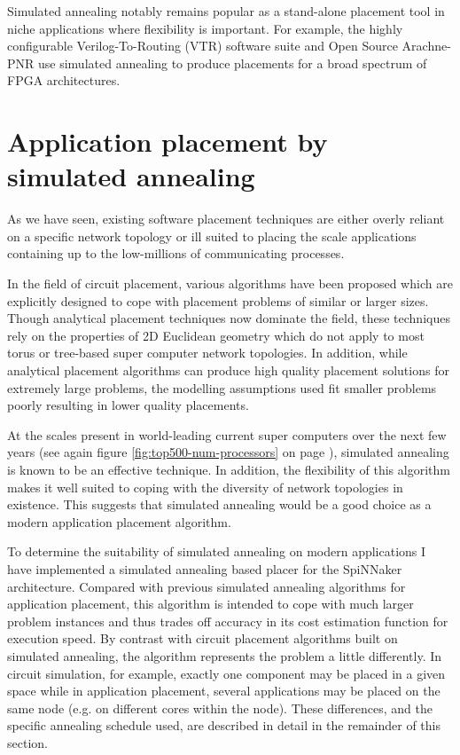 				Simulated annealing notably remains popular as a stand-alone placement
				tool in niche applications where flexibility is important. For example,
				the highly configurable Verilog-To-Routing (VTR) software suite
				\cite{luu14} and Open Source Arachne-PNR \cite{cseed} use simulated
				annealing to produce placements for a broad spectrum of FPGA
				architectures.
	
	\section{Application placement by simulated annealing}
		
		\label{sec:placement-by-annealing}	
		
		As we have seen, existing software placement techniques are either overly
		reliant on a specific network topology or ill suited to placing the scale
		applications containing up to the low-millions of communicating processes.
		
		In the field of circuit placement, various algorithms have been proposed
		which are explicitly designed to cope with placement problems of similar or
		larger sizes. Though analytical placement techniques now dominate the
		field, these techniques rely on the properties of 2D Euclidean geometry
		which do not apply to most torus or tree-based super computer network
		topologies. In addition, while analytical placement algorithms can produce
		high quality placement solutions for extremely large problems, the
		modelling assumptions used fit smaller problems poorly resulting in lower
		quality placements.
		
		At the scales present in world-leading current super computers over the
		next few years (see again figure \ref{fig:top500-num-processors} on page
		\pageref{fig:top500-num-processors}), simulated annealing is known to be an
		effective technique. In addition, the flexibility of this algorithm makes
		it well suited to coping with the diversity of network topologies in
		existence. This suggests that simulated annealing would be a good choice as
		a modern application placement algorithm.
		
		To determine the suitability of simulated annealing on modern applications
		I have implemented a simulated annealing based placer for the SpiNNaker
		architecture. Compared with previous simulated annealing algorithms for
		application placement, this algorithm is intended to cope with much larger
		problem instances and thus trades off accuracy in its cost estimation
		function for execution speed. By contrast with circuit placement algorithms
		built on simulated annealing, the algorithm represents the problem a little
		differently. In circuit simulation, for example, exactly one component may
		be placed in a given space while in application placement, several
		applications may be placed on the same node (e.g. on different cores within
		the node). These differences, and the specific annealing schedule used, are
		described in detail in the remainder of this section.
		
